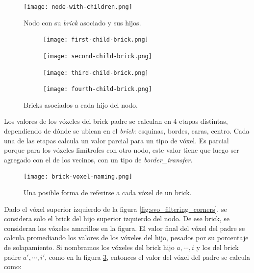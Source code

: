 \begin{figure}[h!]
    \centering
    \texttt{[image: node-with-children.png]}
    \caption{Nodo con su \textit{brick} asociado y sus hijos.}
    \label{fig:node_with_children}
\end{figure}

\begin{figure}[h!]
    \begin{center}
        \begin{subfigure}{.24\textwidth}
            \texttt{[image: first-child-brick.png]}
        \end{subfigure}
        \begin{subfigure}{.24\textwidth}
            \texttt{[image: second-child-brick.png]}
        \end{subfigure}
        \begin{subfigure}{.24\textwidth}
            \texttt{[image: third-child-brick.png]}
        \end{subfigure}
        \begin{subfigure}{.24\textwidth}
            \texttt{[image: fourth-child-brick.png]}
        \end{subfigure}
    \end{center}
    \caption{Bricks asociados a cada hijo del nodo.}
    \label{fig:all_child_bricks}
\end{figure}

Los valores de los vóxeles del brick padre se calculan en 4 etapas distintas, dependiendo de dónde se ubican en el \textit{brick}: esquinas, bordes, caras, centro.
Cada una de las etapas calcula un valor parcial para un tipo de vóxel.
Es parcial porque para los vóxeles limítrofes con otro nodo, este valor tiene que luego ser agregado con el de los vecinos, con un tipo de \textit{border\_transfer}.


\begin{figure}
    \centering
    \texttt{[image: brick-voxel-naming.png]}
    \caption{Una posible forma de referirse a cada vóxel de un brick.}
    \label{fig:brick-voxel-naming}
\end{figure}

Dado el vóxel superior izquierdo de la figura \ref{fig:svo_filtering_corners}, se considera solo el brick del hijo superior izquierdo del nodo.
De ese brick, se consideran los vóxeles amarillos en la figura.
El valor final del vóxel del padre se calcula promediando los valores de los vóxeles del hijo, pesados por su porcentaje de solapamiento.
Si nombramos los vóxeles del brick hijo $a, \cdots, i$ y los del brick padre $a', \cdots, i'$, como en la figura \ref{fig:brick-voxel-naming}, entonces el valor del vóxel del padre se calcula como:


